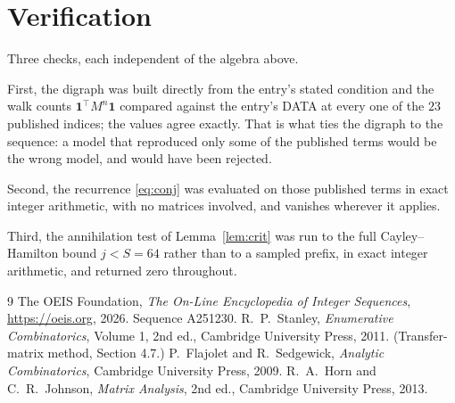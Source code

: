 \documentclass[11pt,a4paper]{article}
\theoremstyle{plain}
\theoremstyle{definition}
\begin{document}
\section{Verification}

Three checks, each independent of the algebra above.

First, the digraph was built directly from the entry's stated condition and the walk counts
$\mathbf{1}^{\!\top}M^{n}\mathbf{1}$ compared against the entry's DATA at every one of
the $23$ published indices; the values agree exactly. That is what ties the digraph to
the sequence: a model that reproduced only some of the published terms would be the wrong
model, and would have been rejected.

Second, the recurrence \eqref{eq:conj} was evaluated on those published terms in exact
integer arithmetic, with no matrices involved, and vanishes wherever it applies.

Third, the annihilation test of Lemma~\ref{lem:crit} was run to the full Cayley--Hamilton
bound $j<S=64$ rather than to a sampled prefix, in exact integer arithmetic, and returned
zero throughout.

\begin{thebibliography}{9}
 The OEIS Foundation, \emph{The On-Line Encyclopedia of Integer
Sequences}, \url{https://oeis.org}, 2026. Sequence A251230.
 R.~P.~Stanley, \emph{Enumerative Combinatorics}, Volume 1, 2nd ed.,
Cambridge University Press, 2011. (Transfer-matrix method, Section 4.7.)
 P.~Flajolet and R.~Sedgewick, \emph{Analytic Combinatorics}, Cambridge
University Press, 2009.
 R.~A.~Horn and C.~R.~Johnson, \emph{Matrix Analysis}, 2nd ed., Cambridge
University Press, 2013.
\end{thebibliography}
\end{document}
